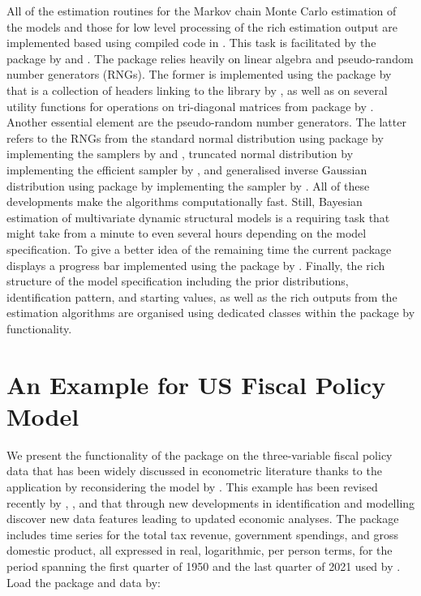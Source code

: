 \documentclass[
  nojss]{jss}
\begin{document}
All of the estimation routines for the Markov chain Monte Carlo
estimation of the models and those for low level processing of the rich
estimation output are implemented based using compiled code in
. This task is facilitated by the  package by
\cite{eddelbuettel2011rcpp} and \cite{eddelbuettel_seamless_2013}. The
 package relies heavily on linear algebra and pseudo-random
number generators (RNGs). The former is implemented using the package
 by \cite{eddelbuettel_rcpparmadillo2014} that is a
collection of headers linking to the  library
 by \cite{sanderson2016armadillo}, as well as on several
utility functions for operations on tri-diagonal matrices from package
 by \cite{factorstochvol}. Another essential element are
the pseudo-random number generators. The latter refers to the RNGs from
the standard normal distribution using package  by
\cite{RcppZiggurat} implementing the samplers by
\cite{marsaglia2000ziggurat} and \cite{leong2005comment}, truncated
normal distribution  by \cite{RcppTN} implementing the
efficient sampler by \cite{Robert1995}, and generalised inverse Gaussian
distribution using package  by \cite{GIGrvg} implementing
the sampler by \cite{hormann2014generating}. All of these developments
make the algorithms computationally fast. Still, Bayesian estimation of
multivariate dynamic structural models is a requiring task that might
take from a minute to even several hours depending on the model
specification. To give a better idea of the remaining time the current
package displays a progress bar implemented using the package
 by \cite{RcppProgress}. Finally, the rich structure
of the model specification including the prior distributions,
identification pattern, and starting values, as well as the rich outputs
from the estimation algorithms are organised using dedicated classes
within the  package by \cite{R6} functionality.

\section{An Example for US Fiscal Policy Model}

We present the functionality of the  package on the
three-variable fiscal policy data that has been widely discussed in
econometric literature thanks to the application by
\cite{mertens_reconciliation_2014} reconsidering the model by
\cite{blanchard_empirical_2002}. This example has been revised recently
by \cite{ramey2016macroeconomic}, \cite{lewis_identifying_2021}, and
\cite{LSUW2022} that through new developments in identification and
modelling discover new data features leading to updated economic
analyses. The package includes time series for the total tax revenue,
government spendings, and gross domestic product, all expressed in real,
logarithmic, per person terms, for the period spanning the first quarter
of 1950 and the last quarter of 2021 used by \cite{LSUW2022}. Load the
package and data by:
\end{document}
